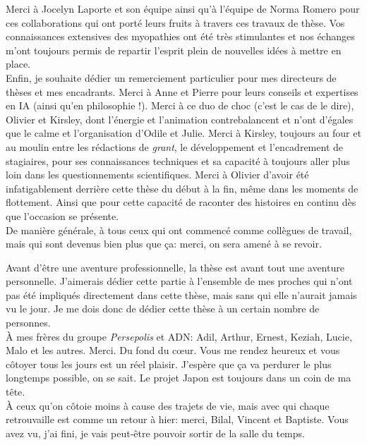 Merci à Jocelyn Laporte et son équipe ainsi qu'à l'équipe de Norma Romero pour ces collaborations qui ont porté leurs fruits à travers ces travaux de thèse. Vos connaissances extensives des myopathies ont été très stimulantes et nos échanges m'ont toujours permis de repartir l'esprit plein de nouvelles idées à mettre en place. \\

Enfin, je souhaite dédier un remerciement particulier pour mes directeurs de thèses et mes encadrants. Merci à Anne et Pierre pour leurs conseils et expertises en IA (ainsi qu'en philosophie !). Merci à ce duo de choc (c'est le cas de le dire), Olivier et Kirsley, dont l'énergie et l'animation contrebalancent et n'ont d'égales que le calme et l'organisation d'Odile et Julie. Merci à Kirsley, toujours au four et au moulin entre les rédactions de \textit{grant}, le développement et l'encadrement de stagiaires, pour ses connaissances techniques et sa capacité à toujours aller plus loin dans les questionnements scientifiques. Merci à Olivier d'avoir été infatigablement derrière cette thèse du début à la fin, même dans les moments de flottement. Ainsi que pour cette capacité de raconter des histoires en continu dès que l'occasion se présente. \\

De manière générale, à tous ceux qui ont commencé comme collègues de travail, mais qui sont devenus bien plus que ça: merci, on sera amené à se revoir. 

Avant d'être une aventure professionnelle, la thèse est avant tout une aventure personnelle. J'aimerais dédier cette partie à l'ensemble de mes proches qui n'ont pas été impliqués directement dans cette thèse, mais sans qui elle n'aurait jamais vu le jour. Je me dois donc de dédier cette thèse à un certain nombre de personnes. \\

À mes frères du groupe \textit{Persepolis} et ADN: Adil, Arthur, Ernest, Keziah, Lucie, Malo et les autres. Merci. Du fond du cœur. Vous me rendez heureux et vous côtoyer tous les jours est un réel plaisir. J'espère que ça va perdurer le plus longtemps possible, on se sait. Le projet Japon est toujours dans un coin de ma tête. \\

À ceux qu'on côtoie moins à cause des trajets de vie, mais avec qui chaque retrouvaille est comme un retour à hier: merci, Bilal, Vincent et Baptiste. Vous avez vu, j'ai fini, je vais peut-être pouvoir sortir de la salle du temps. \\

